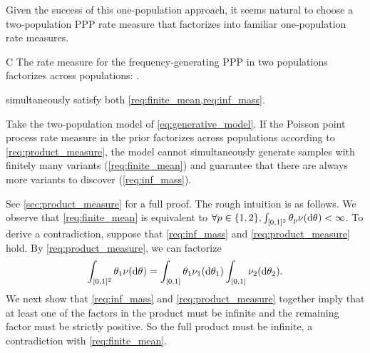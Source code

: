 Given the success of this one-population approach,
it seems natural to choose a two-population PPP rate measure 
that factorizes into familiar one-population rate measures. 
\begin{conditionp}{C} \label{req:product_measure}
	The rate measure for the frequency-generating PPP in two populations factorizes across populations:
	.  
\end{conditionp}

 simultaneously
satisfy both \cref{req:finite_mean,req:inf_mass}.

\begin{myTheorem} \label{prop:incomp}
	Take the two-population model of \cref{eq:generative_model}. If the Poisson point process
	rate measure in the prior factorizes across populations according to \cref{req:product_measure},
	the model cannot simultaneously generate samples with finitely many variants (\cref{req:finite_mean})
	and guarantee that there are always more variants to discover (\cref{req:inf_mass}).
\end{myTheorem}

See \cref{sec:product_measure} for a full proof. The rough intuition is as follows. We observe that \cref{req:finite_mean}
is equivalent to $\forall \popidx \in \{1,2\}, \int_{[0,1]^{2}}\variantfreqperpop{\popidx}\levync(\de\vecvariantfreq{}) < \infty$.
To derive a contradiction, suppose that \cref{req:inf_mass} and \cref{req:product_measure} hold. By \cref{req:product_measure}, we can factorize
\[
	\int_{[0,1]^{2}}\variantfreqperpop{1}\levync(\de\vecvariantfreq{}) = \int_{[0,1]}\variantfreqperpop{1} \levync_{1}(\de\variantfreqperpop{1}) \int_{[0,1]}\levync_{2}(\de\variantfreqperpop{2}).
\]
We next show that \cref{req:inf_mass} and \cref{req:product_measure} together imply that at least one of the factors in the product must be infinite and the remaining factor must be
strictly positive. So the full product must be infinite, a contradiction with \cref{req:finite_mean}.


